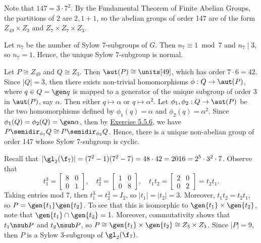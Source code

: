 \begin{solalph}
    \item Note that $147 = 3 \cdot 7^2$. By the Fundamental Theorem of Finite Abelian Groups, the partitions of 2 are $2, 1 + 1$, so the abelian groups of order 147 are of the form $Z_{49} \times Z_3$ and $Z_7 \times Z_7 \times Z_3$.
    \item Let $n_7$ be the number of Sylow 7-subgroups of $G$. Then $n_7 \equiv 1 \bmod 7$ and $n_7 \mid 3$, so $n_7 = 1$. Hence, the unique Sylow 7-subgroup is normal.
    \item Let $P \cong Z_{49}$ and $Q \cong Z_3$. Then $\aut(P) \cong \units[49]$, which has order $7 \cdot 6 = 42$. Since $|Q| = 3$, then there exists non-trivial homomorphisms $\phi : Q \to \aut(P)$, where $q \in Q = \gen q$ is mapped to a generator of the unique subgroup of order 3 in $\aut(P)$, say $\alpha$. Then either $q \mapsto \alpha$ or $q \mapsto \alpha^2$. Let $\phi_1, \phi_2 : Q \to \aut(P)$ be the two homomorphisms defined by $\phi_1(q) = \alpha$ and $\phi_2(q) = \alpha^2$. Since $\phi_1(Q) = \phi_2(Q) = \gen\alpha$, then by \hyperref[ex5.5.6]{Exercise 5.5.6}, we have $P \semidir_{\phi_1} Q \cong P \semidir_{\phi_2} Q$. Hence, there is a unique non-abelian group of order 147 whose Sylow 7-subgroup is cyclic.
    \item Recall that $|\gl_2(\f_7)| = (7^2 - 1)(7^2 - 7) = 48 \cdot 42 = 2016 = 2^5 \cdot 3^2 \cdot 7$. Observe that
    \[t_1^3 = 
    \begin{bmatrix}
        8 & 0 \\
        0 & 1
    \end{bmatrix}, \quad 
    t_2^3 = 
    \begin{bmatrix}
        1 & 0 \\
        0 & 8
    \end{bmatrix}, \quad
    t_1t_2 = 
    \begin{bmatrix}
        2 & 0 \\
        0 & 2
    \end{bmatrix} = t_2t_1.\]
    Taking entries mod 7, then $t_1^3 = t_2^3 = I_2$, so $|t_1| = |t_2| = 3$. Moreover, $t_1t_2 = t_2t_1$, so $P = \gen{t_1}\gen{t_2}$. To see that this is isomorphic to $\gen{t_1} \times \gen{t_2}$, note that $\gen{t_1} \cap \gen{t_2} = 1$. Moreover, commutativity shows that ${t_1} \nsub P$ and ${t_2} \nsub P$, so $P \cong \gen{t_1} \times \gen{t_2} \cong Z_3 \times Z_3$. Since $|P| = 9$, then $P$ is a Sylow 3-subgroup of $\gl_2(\f_7)$.


\end{solalph}
